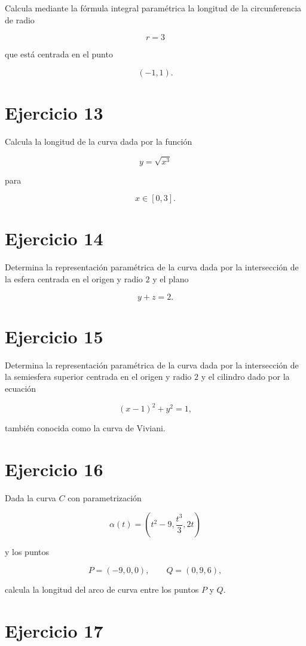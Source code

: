 \documentclass[11pt,a4paper]{article}
\begin{document}
Calcula mediante la fórmula integral paramétrica la longitud de la circunferencia de radio

\[
r=3
\]

que está centrada en el punto

\[
(-1,1).
\]

\section{Ejercicio 13}

Calcula la longitud de la curva dada por la función

\[
y=\sqrt{x^3}
\]

para

\[
x\in[0,3].
\]

\section{Ejercicio 14}

Determina la representación paramétrica de la curva dada por la intersección de la esfera centrada en el origen y radio \(2\) y el plano

\[
y+z=2.
\]

\section{Ejercicio 15}

Determina la representación paramétrica de la curva dada por la intersección de la semiesfera superior centrada en el origen y radio \(2\) y el cilindro dado por la ecuación

\[
(x-1)^2+y^2=1,
\]

también conocida como la curva de Viviani.

\section{Ejercicio 16}

Dada la curva \(C\) con parametrización

\[
\alpha(t)
=
\left(
t^2-9,\frac{t^3}{3},2t
\right)
\]

y los puntos

\[
P=(-9,0,0),
\qquad
Q=(0,9,6),
\]

calcula la longitud del arco de curva entre los puntos \(P\) y \(Q\).

\section{Ejercicio 17}
\end{document}
